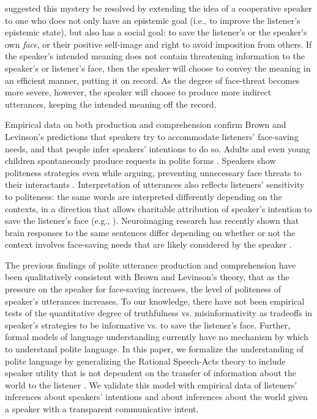\documentclass[10pt,letterpaper]{article}
\begin{document}
 suggested this mystery be resolved by extending the idea of a cooperative speaker to one who does not only have an epistemic goal (i.e., to improve the listener's epistemic state), but also has a social goal: to save the listener's or the speaker's own \emph{face}, or their positive self-image and right to avoid imposition from others. If the speaker's intended meaning does not contain threatening information to the speaker's or listener's face, then the speaker will choose to convey the meaning in an efficient manner, putting it on record. As the degree of face-threat becomes more severe, however, the speaker will choose to produce more indirect utterances, keeping the intended meaning off the record.

Empirical data on both production and comprehension confirm Brown and Levinson's predictions that speakers try to accommodate listeners' face-saving needs, and that people infer speakers' intentions to do so. Adults and even young children spontaneously produce requests in polite forms \cite{clark1980, axia1985}. Speakers show politeness strategies even while arguing, preventing unnecessary face threats to their interactants \cite{holtgraves1997}. Interpretation of utterances also reflects listeners' sensitivity to politeness: the same words are interpreted differently depending on the contexts, in a direction that allows charitable attribution of speaker's intention to save the listener's face (e.g., \cite{bonnefon2009}). Neuroimaging research has recently shown that brain responses to the same sentences differ depending on whether or not the context involves face-saving needs that are likely considered by the speaker \cite{bavsnakova2014}.

The previous findings of polite utterance production and comprehension have been qualitatively consistent with Brown and Levinson's theory, that as the pressure on the speaker for face-saving increases, the level of politeness of speaker's utterances increases. 
To our knowledge, there have not been empirical tests of the quantitative degree of truthfulness vs. misinformativity as tradeoffs in speaker's strategies to be informative vs. to save the listener's face. 
Further, formal models of language understanding currently have no mechanism by which to understand polite language.
In this paper, we formalize the understanding of polite language by generalizing the Rational Speech-Acts theory to include speaker utility that is not dependent on the transfer of information about the world to the listener \cite{Frank2012, Goodman2013}.
We validate this model with empirical data of listeners' inferences about speakers' intentions and about inferences about the world given a speaker with a transparent communicative intent. 
\end{document}
